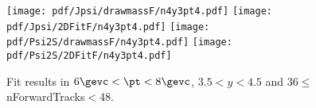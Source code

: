 \begin{figure}[H]
\begin{center}
\texttt{[image: pdf/Jpsi/drawmassF/n4y3pt4.pdf]}
\texttt{[image: pdf/Jpsi/2DFitF/n4y3pt4.pdf]}
\vspace*{-0.5cm}
\texttt{[image: pdf/Psi2S/drawmassF/n4y3pt4.pdf]}
\texttt{[image: pdf/Psi2S/2DFitF/n4y3pt4.pdf]}
\vspace*{-0.5cm}
\end{center}
\caption{Fit results in $6\gevc<\pt<8\gevc$, $3.5<y<4.5$ and 36$\leq$nForwardTracks$<$48.}
\label{Fitn4y3pt4}
\end{figure}
